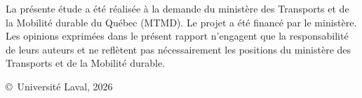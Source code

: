 La présente étude a été réalisée à la demande du ministère des Transports et de la Mobilité durable du Québec (MTMD). Le projet a été financé par le ministère. 
Les opinions exprimées dans le présent rapport n’engagent que la responsabilité de leurs auteurs et ne reflètent pas nécessairement les positions du ministère des Transports et de la Mobilité durable.

\vfill
\noindent
\copyright\ Université Laval, 2026